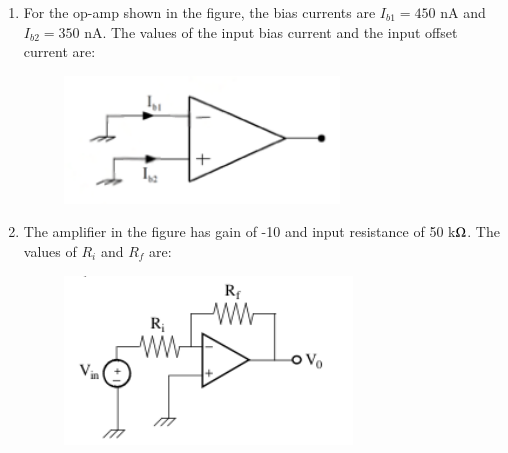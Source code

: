 \documentclass[journal,12pt,onecolumn]{IEEEtran}
\theoremstyle{remark}
\begin{document}
\begin{enumerate}
    
    
    \item For the op-amp shown in the figure, the bias currents are $I_{b1} = 450$ nA and $I_{b2} = 350$ nA. The values of the input bias current  and the input offset current  are:
    \begin{figure}[H]
        \centering
        \includegraphics[width=0.3\columnwidth]{q13}
        \caption*{}
        \label{Q13}
    \end{figure}

    \hfill{}
        \begin{enumerate}
        \end{enumerate}
    
    \item The amplifier in the figure has gain of -10 and input resistance of 50 k$\ohm$. The values of $R_i$ and $R_f$ are:
    \begin{figure}[H]
        \centering
        \includegraphics[width=0.4\columnwidth]{q14}
        \caption*{}
        \label{Q14}
    \end{figure}

    \hfill{}
        \begin{enumerate}
        \end{enumerate}
    

\end{enumerate}
\end{document}
